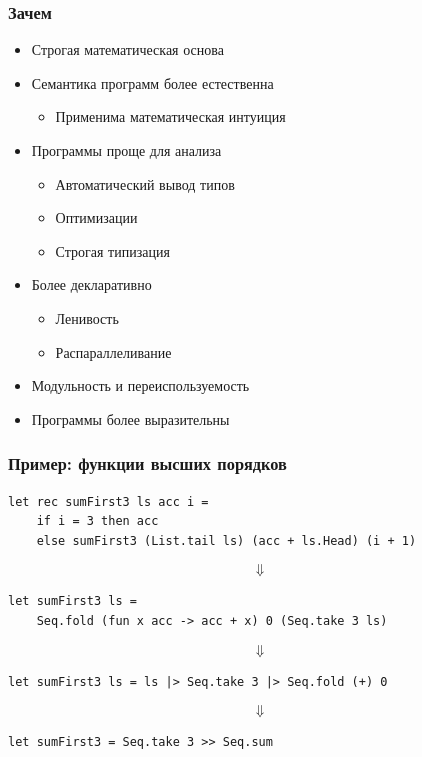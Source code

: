\documentclass[xetex,mathserif,serif]{beamer}
\begin{document}
    \begin{frame}
        \frametitle{Зачем}
        \begin{itemize}
            \item Строгая математическая основа
            \item Семантика программ более естественна
            \begin{itemize}
                \item Применима математическая интуиция
            \end{itemize}
            \item Программы проще для анализа
            \begin{itemize}
                \item Автоматический вывод типов
                \item Оптимизации
                \item Строгая типизация
            \end{itemize}
            \item Более декларативно
            \begin{itemize}
                \item Ленивость
                \item Распараллеливание
            \end{itemize}
            \item Модульность и переиспользуемость
            \item Программы более выразительны
        \end{itemize}
    \end{frame}
    
    \begin{frame}[fragile]
        \frametitle{Пример: функции высших порядков}
        \begin{verbatim}
let rec sumFirst3 ls acc i =
    if i = 3 then acc 
    else sumFirst3 (List.tail ls) (acc + ls.Head) (i + 1)
        \end{verbatim}
        $$\Downarrow$$
        \begin{verbatim}
let sumFirst3 ls = 
    Seq.fold (fun x acc -> acc + x) 0 (Seq.take 3 ls)
        \end{verbatim}
        $$\Downarrow$$
        \begin{verbatim}
let sumFirst3 ls = ls |> Seq.take 3 |> Seq.fold (+) 0
        \end{verbatim}
        $$\Downarrow$$
        \begin{verbatim}
let sumFirst3 = Seq.take 3 >> Seq.sum
        \end{verbatim}
    \end{frame}
\end{document}
